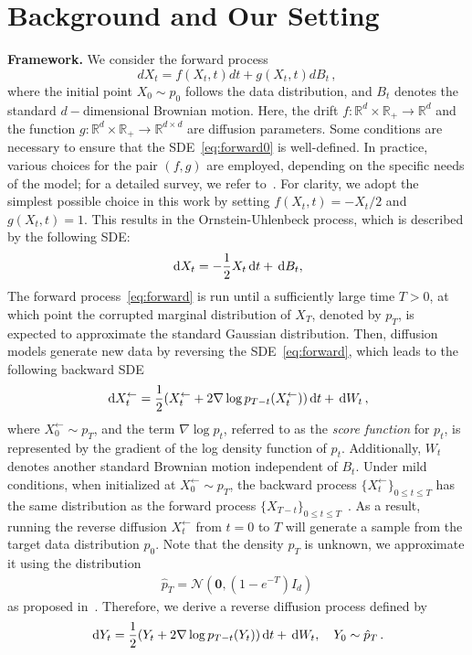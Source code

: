 \documentclass[11pt]{article}
\def\rmd{{\,\rm d}}
\begin{document}
\section{Background and Our Setting}
\label{sec:setting}
\textbf{Framework.} \quad We consider the forward process
{
\begin{equation}
\label{eq:forward0}
dX_t= f(X_t,t)dt+g(X_t,t)dB_t\,,
\end{equation}}
where the initial point $X_0\sim  p_0$ follows the data distribution, and $B_t$ denotes the standard $d-$dimensional Brownian motion.
Here, the drift $f: \mathbb{R}^d\times \mathbb{R}_+\to \mathbb{R}^d$ and the function $g:\mathbb{R}^d\times \mathbb{R}_+\to \mathbb{R}^{d\times d}$ are diffusion parameters.
Some conditions are necessary to ensure that the SDE~\eqref{eq:forward0} is well-defined. 
In practice, various choices for the pair $(f, g)$ are employed, depending on the specific needs of the model; for a detailed survey, we refer to~\cite{tang2024score}.
For clarity, we adopt the simplest possible choice in this work by setting $f(X_t,t)=-X_t/2$ and $g(X_t,t)=1$.
This results in the Ornstein-Uhlenbeck process, which is described by the following SDE:
\begin{equation}
    \rmd X_t=-\frac{1}{2}X_t\rmd t+\rmd B_t,
    \label{eq:forward}
\end{equation}
The forward process~\eqref{eq:forward} is run until a sufficiently large time $T > 0$,  at which point the corrupted marginal distribution of $X_T$, denoted by $p_T$, is expected to approximate the standard Gaussian distribution.
Then, diffusion models generate new data by reversing the SDE~\eqref{eq:forward}, which leads to the following backward SDE
\begin{equation}
\rmd X_t^{\leftarrow} = \frac{1}{2}\left(X_t^{\leftarrow} + 2\nabla \log p_{T-t}(X_t^{\leftarrow})\right) \rmd t + \rmd W_t\,,
\label{eq:backward}
\end{equation}
where $X^\leftarrow_0\sim p_T$, and the term $\nabla \log p_t$, referred to as the \textit{score function} for $p_t$, is represented by the gradient of the log density function of $p_t$. 
Additionally, $W_t$ denotes another standard Brownian motion independent of $B_t$.
Under mild conditions, when initialized at
$X^\leftarrow_0\sim p_T$, the backward process $\{X^\leftarrow_t\}_{0\leqslant t\leqslant T}$ has the same distribution as the forward process $\{X_{T-t}\}_{0\leqslant t\leqslant T}$~\cite{anderson1982reverse,cattiaux2023time}. 
As a result, running the reverse diffusion $X^{\leftarrow}_t$ from $t=0$ to $T$ will generate a sample from the target data distribution $p_0$.
Note that the density $p_T$ is unknown, we approximate it using the distribution
\begin{align*}
\hat p_T= \mathcal{N}(\mathbf{0},(1-e^{-T})I_d)
\end{align*}
as proposed in~\cite{gao2023wasserstein}. Therefore, we derive a reverse diffusion process defined by
\begin{align}
    \label{eq:Yt}
    \rmd Y_t=\dfrac{1}{2}(Y_t+2\nabla\log p_{T-t}(Y_t))\rmd t+\rmd W_t,\quad Y_0\sim \hat{p}_T\,.
\end{align}
\end{document}
